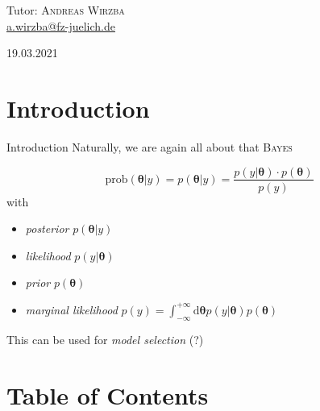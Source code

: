 \documentclass[11pt,aspectratio=1610,dvipsnames]{beamer}
\newcommand{\btheta}{\boldsymbol{\theta}}
\begin{document}
\begin{frame}[plain]
\begin{minipage}{\linewidth}
	Tutor: \textsc{Andreas Wirzba}\\
	\scriptsize \href{mailto:a.wirzba@fz-juelich.de}{\faEnvelope  \hspace*{0.1cm}a.wirzba@fz-juelich.de}
	\end{minipage}
	\vspace{0.2cm}
	
	19.03.2021
	 
	
 		
\end{frame}


\section*{Introduction}
\begin{frame}{Introduction}
	Naturally, we are again all about that \textsc{Bayes}
	\begin{tcolorbox}[colback=black!5,colframe=gray!15!black,title=\textsc{Bayes'} Theorem] 
		$$\text{prob}(\btheta|y)=p(\btheta|y)= \frac{p(y|\boldsymbol{\theta})\cdot p(\boldsymbol{\theta})}{p(y)}$$
		with
		\begin{itemize}
			\item \emph{posterior} $p(\btheta|y)$\\
			\item \emph{likelihood} $p(y|\boldsymbol{\theta})$\\
			\item \emph{prior} $p(\boldsymbol{\theta})$\\
			\item \emph{marginal likelihood} $p(y)=\int_{-\infty}^{+\infty}\text{d}\boldsymbol{\theta} p(y|\boldsymbol{\theta})p(\boldsymbol{\theta})$\\
		\end{itemize}
\end{tcolorbox}
This can be used for \emph{model selection} (?)
\end{frame}


\section*{Table of Contents}
\end{document}

